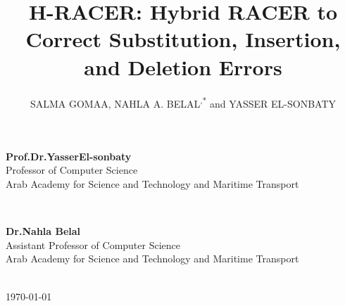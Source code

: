 \documentclass{llncs}
\begin{document}
\begin{titlepage}
\begin{minipage}{0.45\textwidth}
\begin{flushleft}
\center
{\large \bfseries Prof.Dr.YasserEl-sonbaty}\\
{Professor of Computer Science}\\
{Arab Academy for Science and Technology and Maritime Transport}
\end{flushleft}
\end{minipage}
~
\begin{minipage}{0.47\textwidth}
\begin{flushright}
\center
{\large \bfseries Dr.Nahla Belal}\\
{Assistant Professor of Computer Science \\
Arab Academy for Science and Technology and Maritime Transport}
\end{flushright}
\end{minipage}\\[1cm]
{\monthyeardate\today}\\[0.2cm] 
\vfill %
\end{titlepage}

\title{H-RACER: Hybrid RACER to Correct Substitution, Insertion, and Deletion Errors}

\author{SALMA GOMAA\fnmsep{}, NAHLA A. BELAL\fnmsep{}\textsuperscript{,*} and YASSER EL-SONBATY\fnmsep{}}

\end{document}
